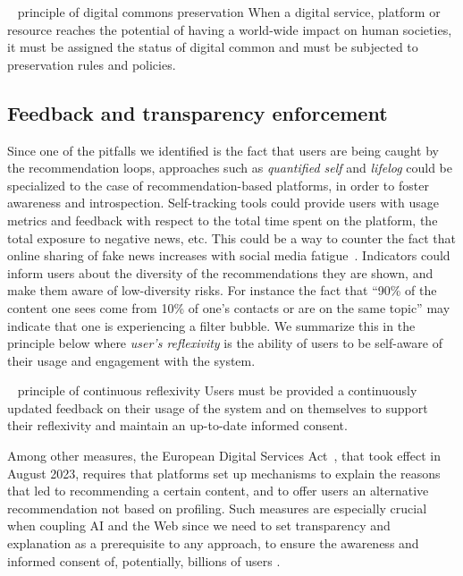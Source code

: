 \documentclass[10pt]{article}
\begin{document}
\begin{principle}{\faThumbTack ~ principle of digital commons preservation}
When a digital service, platform or resource 
reaches the potential of having  a world-wide impact on human societies, it must be assigned the status of digital common and must be subjected to preservation rules and policies.
\end{principle}



\subsection{Feedback and transparency enforcement}
Since one of the pitfalls we identified is the fact that users are being caught by the recommendation loops, 
approaches such as \textit{quantified self} and \textit{lifelog} could be specialized to the case of recommendation-based platforms, in order to foster awareness and introspection.
Self-tracking tools could provide users with usage metrics and feedback with respect to the total time spent on the platform, the total exposure to negative news, etc.
This could be a way to counter the fact that online sharing of fake news increases with social media fatigue~\cite{talwar_why_2019}.
Indicators could inform users about the diversity of the recommendations they are shown, and make them aware of low-diversity risks. For instance the fact that ``90\% of the content one sees come from 10\% of one's contacts or are on the same topic'' may indicate that one is experiencing a filter bubble.
%
We summarize this in the principle below where \textit{user's reflexivity} is the ability of users to be self-aware of their usage and engagement with the system.

\begin{principle}{\faThumbTack ~ principle of continuous reflexivity}
Users must be provided a continuously updated feedback on their usage of the system and on themselves to support their reflexivity and maintain an up-to-date informed consent.
\end{principle}

Among other measures, the European Digital Services Act~\cite{european_union_regulation_nodate}, that took effect in August 2023, requires that platforms set up mechanisms to explain the reasons that led to recommending a certain content, and to offer users an alternative recommendation not based on profiling.
Such measures are especially crucial when coupling AI and the Web since we need to set transparency and explanation as a prerequisite to any approach, to ensure the awareness and informed consent of, potentially, billions of users \cite{berendt:hal-03189474}.
\end{document}
